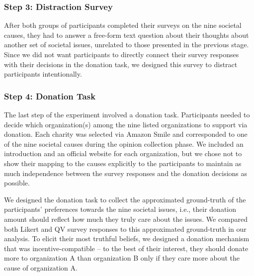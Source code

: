 
\subsubsection{Step 3: Distraction Survey}
After both groups of participants completed their surveys on the nine societal causes, they had to answer a free-form text question about their thoughts about another set of societal issues, unrelated to those presented in the previous stage. Since we did not want participants to directly connect their survey responses with their decisions in the donation task, we designed this survey to distract participants intentionally. 

\subsubsection{Step 4: Donation Task}
The last step of the experiment involved a donation task. Participants needed to decide which organization(s) among the nine listed organizations to support via donation. Each charity was selected via Amazon Smile and corresponded to one of the nine societal causes during the opinion collection phase. We included an introduction and an official website for each organization, but we chose not to show their mapping to the causes explicitly to the participants to maintain as much independence between the survey responses and the donation decisions as possible. 

We designed the donation task to collect the approximated ground-truth of the participants' preferences towards the nine societal issues, i.e., their donation amount should reflect how much they truly care about the issues. We compared both Likert and QV survey responses to this approximated ground-truth in our analysis. To elicit their most truthful beliefs, we designed a donation mechanism that was incentive-compatible -- to the best of their interest, they should donate more to organization A than organization B only if they care more about the cause of organization A. 

